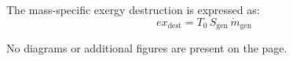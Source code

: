 The mass-specific exergy destruction is expressed as:  
\[
ex_{\text{dest}} = T_0 \, S_{\text{gen}} \, \dot{m}_{\text{gen}}
\]  

No diagrams or additional figures are present on the page.
